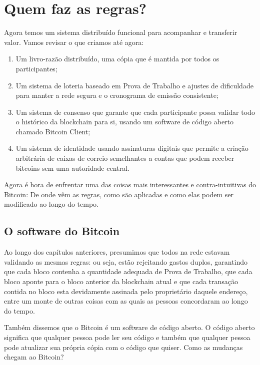 \chapter{Quem faz as regras?}
\label{ch:capitulo8}

Agora temos um sistema distribuído funcional para acompanhar e transferir valor.
Vamos revisar o que criamos até agora:

\begin{samepage}
\begin{enumerate}
\item Um livro-razão distribuído, uma cópia que é mantida por todos os participantes;
\item Um sistema de loteria baseado em Prova de Trabalho e ajustes de dificuldade para manter a rede segura e o cronograma de emissão consistente;
\item Um sistema de consenso que garante que cada participante possa validar todo o histórico da blockchain para si, usando um software de código aberto chamado Bitcoin Client;
\item Um sistema de identidade usando assinaturas digitais que permite a criação arbitrária de caixas de correio semelhantes a contas que podem receber bitcoins sem uma autoridade central.
\end{enumerate}
\end{samepage}

Agora é hora de enfrentar uma das coisas mais interessantes e contra-intuitivas do Bitcoin: De onde vêm as regras, como são aplicadas e como elas podem ser modificado ao longo do tempo.

\section*{O software do Bitcoin}


Ao longo dos capítulos anteriores, presumimos que todos na rede estavam validando as mesmas regras: ou seja, estão rejeitando gastos duplos, garantindo que cada bloco contenha a quantidade adequada de Prova de Trabalho, que cada bloco aponte para o bloco anterior da blockchain atual e que cada transação contida no bloco esta devidamente assinada pelo proprietário daquele endereço, entre um monte de outras coisas com as quais as pessoas concordaram ao longo do tempo.

Também dissemos que o Bitcoin é um software de código aberto. 
O código aberto significa que qualquer pessoa pode ler seu código e também que qualquer pessoa pode atualizar sua própria cópia com o código que quiser. 
Como as mudanças chegam ao Bitcoin?


